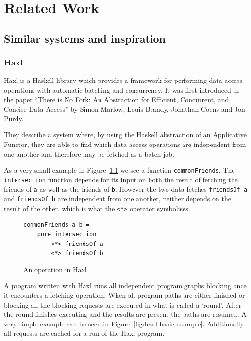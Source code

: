 \chapter{Related Work}

\label{ch:related-work}

\section{Similar systems and inspiration}

\subsection{Haxl}

Haxl\cite{Haxl:library:link}\cite{Marlow:2014:NFA:2692915.2628144} is a Haskell\cite{HaskellLanguage} library which provides a framework for performing data access operations with automatic batching and concurrency. It was first introduced in the paper ``There is No Fork: An Abstraction for Efficient, Concurrent, and Concise Data Access''\cite{Marlow:2014:NFA:2692915.2628144} by Simon Marlow, Louis Brandy, Jonathan Coens and Jon Purdy.

They describe a system where, by using the Haskell abstraction of an Applicative Functor\cite{mcbride2008applicative}, they are able to find which data access operations are independent from one another and therefore may be fetched as a batch job.

As a very small example in Figure~\ref{fig:operation-in-haxl} we see a function \texttt{commonFriends}.
The \texttt{intersection} function depends for its input on both the result of fetching the friends of \texttt{a} as well as the friends of \texttt{b}.
However the two data fetches \texttt{friendsOf a} and \texttt{friendsOf b} are independent from one another, neither depends on the result of the other, which is what the \texttt{<*>} operator symbolises.

\begin{figure}[h]
\begin{verbatim}
commonFriends a b =
    pure intersection
        <*> friendsOf a
        <*> friendsOf b
\end{verbatim}
\caption{An operation in Haxl}
\label{fig:operation-in-haxl}
\end{figure}

A program written with Haxl runs all independent program graphs blocking once it encounters a fetching operation.
When all program paths are either finished or blocking all the blocking requests are executed in what is called a `round'.
After the round finishes executing and the results are present the paths are resumed.
A very simple example can be seen in Figure~\ref{fig:haxl-basic-example}.
Additionally all requests are cached for a run of the Haxl program.

